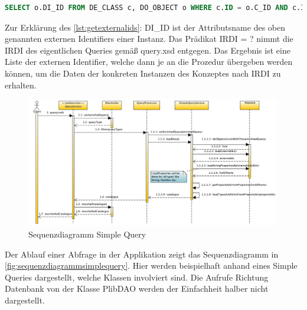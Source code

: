 \begin{lstlisting}[caption=SQL Query - Externe IDs abfragen, language=SQL, label=lst:getexternalids]
SELECT o.DI_ID FROM DE_CLASS c, DO_OBJECT o WHERE c.ID = o.C_ID AND c.IRDI = ?
\end{lstlisting}

Zur Erklärung des \autoref{lst:getexternalids}:
DI\_ID ist der Attributsname des oben genannten externen Identifiers einer Instanz. Das Prädikat \gls{IRDI} = ? nimmt die \gls{IRDI} des eigentlichen Queries gemäß query.xsd entgegen. Das Ergebnis ist eine Liste der externen Identifier, welche dann je an die Prozedur übergeben werden können, um die Daten der konkreten Instanzen des Konzeptes nach \gls{IRDI} zu erhalten. 

\begin{figure}[htbp]
	\centering
		\includegraphics[width=0.99\textwidth]{images/plib_simple_query_sequence_diagram.jpg}
		\caption{Sequenzdiagramm Simple Query}
	\label{fig:sequenzdiagrammsimplequery}
\end{figure}

Der Ablauf einer Abfrage in der Applikation zeigt das Sequenzdiagramm in \autoref{fig:sequenzdiagrammsimplequery}. Hier werden beispielhaft anhand eines Simple Queries dargestellt, welche Klassen involviert sind. Die Aufrufe Richtung Datenbank von der Klasse PlibDAO werden der Einfachheit halber nicht dargestellt. 

